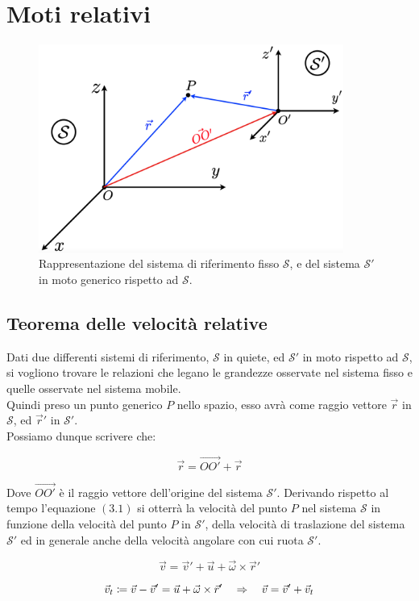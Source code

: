 \chapter{Moti relativi}
\begin{figure}[htbp]
\begin{center}
\includegraphics[width=10cm]{images/motirelativi.png}
\caption{Rappresentazione del sistema di riferimento fisso $\mathcal{S}$, e del sistema  $\mathcal{S'}$ in moto generico rispetto ad  $\mathcal{S}$.}
\end{center}
\end{figure}

\section{Teorema delle velocità relative}

Dati due differenti sistemi di riferimento,  $\mathcal{S}$ in quiete, ed  $\mathcal{S'}$ in moto rispetto ad  $\mathcal{S}$, si vogliono trovare le relazioni che legano le grandezze osservate nel sistema fisso e quelle osservate nel sistema mobile.\\
Quindi preso un punto generico $P$ nello spazio, esso avrà come raggio vettore $\vec r$ in  $\mathcal{S}$, ed $\vec r'$ in  $\mathcal{S'}$.
\\Possiamo dunque scrivere che:

\begin{equation}
\vec r = \vec{OO'}+\vec r
\end{equation}

Dove $\vec{OO'}$ è il raggio vettore dell'origine del sistema $\mathcal{S'}$. Derivando rispetto al tempo l'equazione $(3.1)$ si otterrà la velocità del punto $P$ nel sistema $\mathcal{S}$ in funzione della velocità del punto $P$ in $\mathcal{S'}$, della velocità di traslazione del sistema $\mathcal{S'}$ ed in generale anche della velocità angolare con cui ruota $\mathcal{S'}$.

\begin{equation}
\boxed{\vec v = \vec v' + \vec u + \vec \omega\times\vec r'}
\end{equation}

\begin{equation}
\vec v_t \coloneqq \vec v - \vec v' = \vec u + \vec \omega\times\vec r'\quad\Rightarrow\quad \vec v = \vec v' + \vec v_t
\end{equation}
